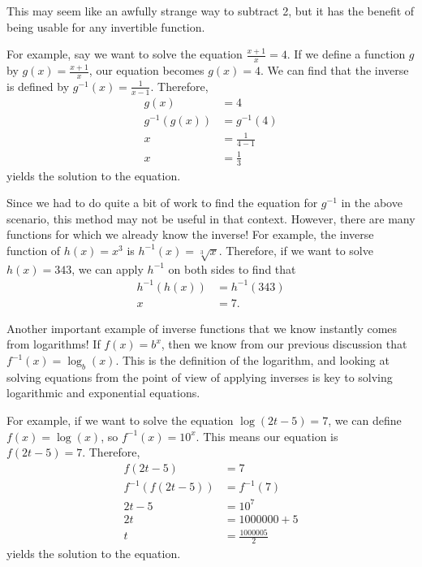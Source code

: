 \documentclass[nooutcomes]{ximera}
\begin{document}
This may seem like an awfully strange way to subtract 2, but it has the benefit of being usable for any invertible function. 

For example, say we want to solve the equation $\frac{x + 1}{x} = 4$. If we define a function $g$ by $g(x) = \frac{x + 1}{x}$, our equation becomes $g(x) = 4$. We can find that the inverse is defined by $g^{-1}(x) = \frac{1}{x - 1}$. Therefore, 
\begin{align*}
g(x) & = 4 \\
g^{-1}(g(x)) & = g^{-1}(4) \\
x & = \frac{1}{4 - 1} \\
x & = \frac{1}{3}
\end{align*}
yields the solution to the equation. 

Since we had to do quite a bit of work to find the equation for $g^{-1}$ in the above scenario, this method may not be useful in that context. However, there are many functions for which we already know the inverse! For example, the inverse function of $h(x) = x^3$ is $h^{-1}(x) = \sqrt[3]{x}$. Therefore, if we want to solve $h(x) = 343$, we can apply $h^{-1}$ on both sides to find that 
\begin{align*}
h^{-1}(h(x)) & = h^{-1}(343) \\
x & = 7.
\end{align*}

Another important example of inverse functions that we know instantly comes from logarithms! If $f(x) = b^x$, then we know from our previous discussion that $f^{-1}(x) = \log_b(x)$. This is the definition of the logarithm, and looking at solving equations from the point of view of applying inverses is key to solving logarithmic and exponential equations. 

For example, if we want to solve the equation $\log(2t - 5) = 7$, we can define $f(x) = \log(x)$, so $f^{-1}(x) = 10^x$. This means our equation is $f(2t - 5) = 7$. Therefore, 
\begin{align*}
f(2t - 5) & = 7 \\
f^{-1}(f(2t - 5)) & = f^{-1}(7) \\
2t - 5 & = 10^7 \\
2t &= 1000000 + 5 \\
t &= \frac{1000005}{2}
\end{align*}
yields the solution to the equation. 
\end{document}
